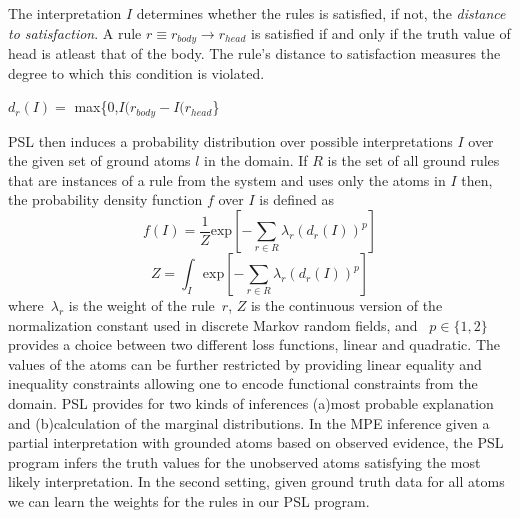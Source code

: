 The interpretation $\mathit{I}$ determines whether the rules is satisfied, if not, the \emph{distance to satisfaction}.
A rule $\mathit{r} \equiv \mathit{r_{body}} \rightarrow \mathit{r_{head}} $  is satisfied if and only if the truth value of head is atleast that of the body. The rule's distance to satisfaction measures the degree to which this condition is violated.
 \newline
\begin{center} 
 $\mathit{d_r}(\mathit{I}) =$ max\{0,$\mathit{I(r_{body}} - \mathit{I(r_{head}}$\}
 \end{center}

PSL then induces a probability distribution over possible interpretations $\mathit{I}$ over the given set of ground atoms $\mathit{l} $ in the domain. 
If $\mathit{R}$ is the set of all ground rules that are instances of a rule from the system and uses only the atoms in  $\mathit{I}$ then,
the probability density function $\mathit{f}$ over $\mathit{I}$ is defined as
\begin{equation}
\label{eq:contimn1}
    f (I) = \frac{1}{Z} \text{exp}[-\sum_{r\in R} \lambda_r (d_r(I))^p]
\end{equation}
\begin{equation}
\label{eq:contimn2}
	Z = \int_{I} \text{exp} [ -\sum_{r\in R} \lambda_r (d_r(I))^p ]
\end{equation}
where~$\lambda_r$ is the weight of the rule~$r$, $Z$ is the continuous version of the normalization constant used in discrete Markov random fields, and ~$p \in \{1, 2\}$ provides a choice between two different loss functions, linear and quadratic.
The values of the atoms can be further restricted by providing linear equality and inequality constraints allowing one to encode functional constraints from the domain. 
PSL provides for two kinds of inferences (a)most probable explanation and (b)calculation of the marginal distributions. 
In the MPE inference given a partial interpretation with grounded atoms based on observed evidence, the PSL program infers the truth values for the unobserved atoms satisfying the most likely interpretation. 
In the second setting, given ground truth data for all atoms we can learn the weights for the rules in our PSL program.
